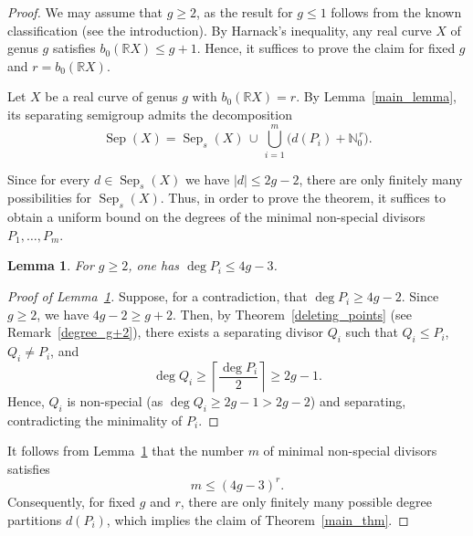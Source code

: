 \documentclass[10pt,a4paper]{amsart}
\newtheorem{lemma}{Lemma}
\newcommand{\N}{\mathbb{N}}
\newcommand{\R}{\mathbb{R}}
\DeclareMathOperator{\Sep}{Sep}
\begin{document}
  \begin{proof} 
    We may assume that $g \geqslant 2$, as the result for $g \leqslant 1$ follows from the known classification (see the introduction). By Harnack's inequality, any real curve $X$ of genus $g$ satisfies $b_0(\R X) \leqslant g + 1$.  Hence, it suffices to prove the claim for fixed $g$ and $r = b_0(\R X)$.

    Let $X$ be a real curve of genus $g$ with $b_0(\R X) = r$.  By Lemma~\ref{main_lemma}, its separating semigroup admits the decomposition
    \[
      \Sep(X) = \Sep_s(X) \,\cup\, \bigcup_{i=1}^{m} \bigl( d(P_i) + \N_0^{\,r} \bigr).
    \]

    Since for every $d \in \Sep_s(X)$ we have $|d| \leqslant 2g - 2$, there are only finitely many possibilities for $\Sep_s(X)$. Thus, in order to prove the theorem, it suffices to obtain a uniform bound on the degrees of the minimal non-special divisors $P_1, \ldots, P_m$.

    \begin{lemma}\label{4g-3_lemma}
    For $g \geqslant 2$, one has $\deg P_i \leqslant 4g - 3$.
    \end{lemma}

    \begin{proof}[Proof of Lemma~\ref{4g-3_lemma}]
    Suppose, for a contradiction, that $\deg P_i \geqslant 4g - 2$. 
    Since $g \geqslant 2$, we have $4g - 2 \geqslant g + 2$. 
    Then, by Theorem~\ref{deleting_points} (see Remark~\ref{degree_g+2}), there exists a separating divisor $Q_i$ such that $Q_i \leqslant P_i$, $Q_i \ne P_i$, and
    \[
      \deg Q_i \geqslant \left\lceil \frac{\deg P_i}{2} \right\rceil \geqslant 2g - 1.
    \]
    Hence, $Q_i$ is non-special (as $\deg Q_i \geqslant 2g - 1 > 2g - 2$) and separating, contradicting the minimality of $P_i$.
    \end{proof}

    It follows from Lemma~\ref{4g-3_lemma} that the number $m$ of minimal non-special divisors satisfies 
    \[m \leqslant (4g - 3)^r.\]
      Consequently, for fixed $g$ and $r$, there are only finitely many possible degree partitions $d(P_i)$, which implies the claim of Theorem~\ref{main_thm}.

    \end{proof}
\end{document}
